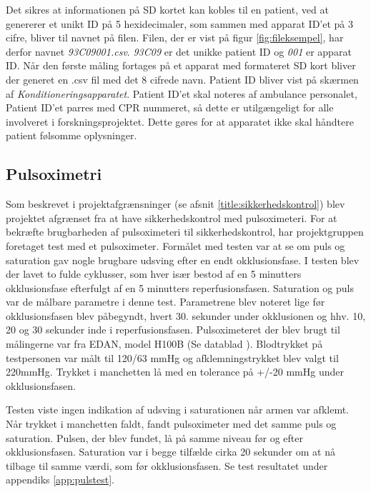 Det sikres at informationen på SD kortet kan kobles til en patient, ved at genererer et unikt ID på 5 hexidecimaler, som sammen med apparat ID'et på 3 cifre, bliver til navnet på filen. Filen, der er vist på figur \ref{fig:fileksempel}, har derfor navnet \textit{93C09001.csv}. \textit{93C09} er det unikke patient ID og \textit{001} er apparat ID. Når den første måling fortages på et apparat med formateret SD kort bliver der generet en .csv fil med det 8 cifrede navn. Patient ID bliver vist på skærmen af \textit{Konditioneringsapparatet}. Patient ID'et skal noteres af ambulance personalet, Patient ID'et parres med CPR nummeret, så dette er utilgængeligt for alle involveret i forskningsprojektet. Dette gøres for at apparatet ikke skal håndtere patient følsomme oplysninger.

\subsection{Pulsoximetri} \label{title:pulsOxi}
Som beskrevet i projektafgrænsninger (se afsnit \ref{title:sikkerhedskontrol}) blev projektet afgrænset fra at have sikkerhedskontrol med pulsoximeteri. For at bekræfte brugbarheden af pulsoximeteri til sikkerhedskontrol, har projektgruppen foretaget test med et pulsoximeter. Formålet med testen var at se om puls og saturation gav nogle brugbare udsving efter en endt okklusionsfase. I testen blev der lavet to fulde cyklusser, som hver især bestod af en 5 minutters okklusionsfase efterfulgt af en 5 minutters reperfusionsfasen. Saturation og puls var de målbare parametre i denne test. Parametrene blev noteret lige før okklusionsfasen blev påbegyndt, hvert 30. sekunder under okklusionen og hhv. 10, 20 og 30 sekunder inde i reperfusionsfasen. Pulsoximeteret der blev brugt til målingerne var fra EDAN, model H100B (Se datablad \cite{RefWorks:30}). Blodtrykket på testpersonen var målt til 120/63 mmHg og afklemningstrykket blev valgt til 220mmHg. Trykket i manchetten lå med en tolerance på +/-20 mmHg under okklusionsfasen. 

Testen viste ingen indikation af udsving i saturationen når armen var afklemt. Når trykket i manchetten faldt, fandt pulsoximeter med det samme puls og saturation. Pulsen, der blev fundet, lå på samme niveau før og efter okklusionsfasen. Saturation var i begge tilfælde cirka 20 sekunder om at nå tilbage til samme værdi, som før okklusionsfasen. Se test resultatet under appendiks \ref{app:pulstest}.

